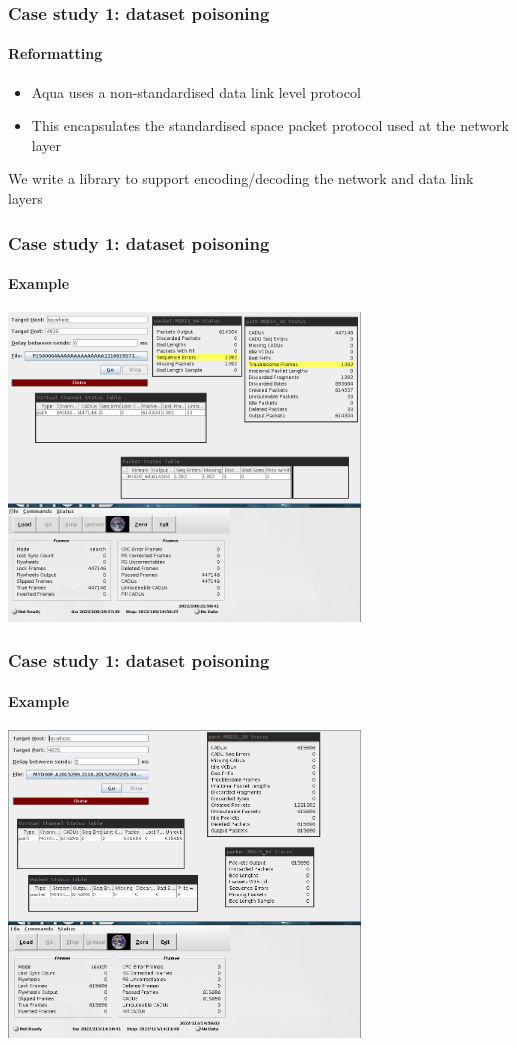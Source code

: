 \documentclass{beamer}
\begin{document}
\begin{frame}
  \frametitle{Case study 1: dataset poisoning}
  \framesubtitle{Reformatting}
  \begin{itemize}
    \item Aqua uses a non-standardised data link level protocol
    \item This encapsulates the standardised space packet protocol used at the network layer
  \end{itemize}

  We write a library to support encoding/decoding the network and data link layers
\end{frame}
\begin{frame}
  \frametitle{Case study 1: dataset poisoning}
  \framesubtitle{Example}
  \includegraphics[width=0.7\textwidth]{images/rtstps_incorrect.png}
\end{frame}

\begin{frame}
  \frametitle{Case study 1: dataset poisoning}
  \framesubtitle{Example}
  \includegraphics[width=0.7\textwidth]{images/rtstps_correct.png}
\end{frame}
\end{document}
